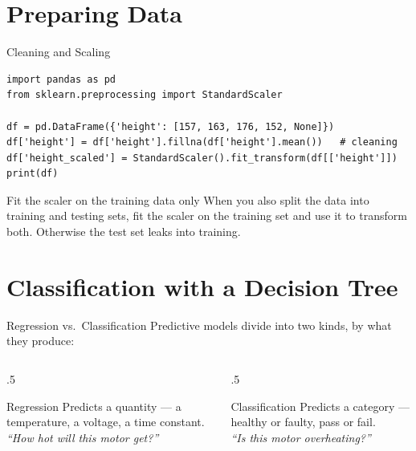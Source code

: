 \documentclass[9pt,aspectratio=169,xcolor=table]{beamer}
\begin{document}
\section{Preparing Data}

\begin{frame}[fragile]{Cleaning and Scaling}
    \leavevmode
\begin{lstlisting}
import pandas as pd
from sklearn.preprocessing import StandardScaler

df = pd.DataFrame({'height': [157, 163, 176, 152, None]})
df['height'] = df['height'].fillna(df['height'].mean())   # cleaning
df['height_scaled'] = StandardScaler().fit_transform(df[['height']])
print(df)
\end{lstlisting}

    \begin{alertblock}{Fit the scaler on the training data only}
        \small When you also split the data into training and testing
        sets, fit the scaler on the \alert{training set} and use it to
        transform both. Otherwise the test set leaks into training.
    \end{alertblock}
\end{frame}

\section{Classification with a Decision Tree}

\begin{frame}{Regression vs.\ Classification}
    \leavevmode
    Predictive models divide into two kinds, by what they produce:

    \vspace{2mm}
    \begin{columns}[t]
        \begin{column}{.5\textwidth}
            \begin{block}{Regression}
                \small Predicts a \alert{quantity} --- a temperature, a
                voltage, a time constant. \\
                \emph{``How hot will this motor get?''}
            \end{block}
        \end{column}
        \begin{column}{.5\textwidth}
            \begin{block}{Classification}
                \small Predicts a \alert{category} --- healthy or
                faulty, pass or fail. \\
                \emph{``Is this motor overheating?''}
            \end{block}
        \end{column}
    \end{columns}
\end{frame}
\end{document}
